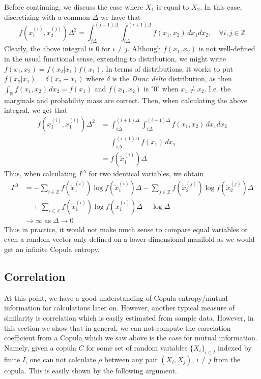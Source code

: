 \documentclass[../Thesis.tex]{subfiles}
\begin{document}
Before continuing, we discuss the case where $X_1$ is equal to $X_2$. In this case, discretizing with a common $\Delta$ we have that
$$f\left(x_1^{(i)}, x_2^{(j)}\right)\Delta^2 = \int_{j\Delta}^{(j+1)\Delta}\int_{i\Delta}^{(i+1)\Delta} f(x_1,x_2) \, dx_1 dx_2,\quad \forall i,j\in\mathbb{Z}$$
Clearly, the above integral is $0$ for $i\neq j$. Although $f(x_1,x_2)$ is not well-defined in the usual functional sense, extending to distribution, we might write $f(x_1,x_2) = f(x_2 | x_1) f(x_1)$. In terms of distributions, it works to put $f(x_2 | x_1) = \delta(x_2 - x_1)$ where $\delta$ is the \textit{Dirac delta} distribution, as then $\int_{\mathbb{R}} f(x_1,x_2) \, dx_2 = f(x_1)$ and $f(x_1, x_2)$ is "$0$" when $x_1 \neq x_2$. I.e. the marginals and probability mass are correct. Then, when calculating the above integral, we get that
\begin{align*}
    f\left(x_1^{(i)}, x_1^{(i)}\right)\Delta^2 & = \int_{i\Delta}^{(i+1)\Delta}\int_{i\Delta}^{(i+1)\Delta} f(x_1,x_2) \, dx_1 dx_2 \\
                                               & = \int_{i\Delta}^{(i+1)\Delta} f\left(x_1\right)\, dx_1                            \\
                                               & = f\left(\tilde{x}_1^{(i)}\right)\Delta
\end{align*}
Thus, when calculating $I^{\Delta}$ for two identical variables, we obtain
\begin{align*}
    I^{\Delta} & = -\sum_{i\in\mathbb{Z}} f\left(\tilde{x}_1^{(i)}\right) \log{f\left(\tilde{x}_1^{(i)}\right)}\Delta - \sum_{j\in\mathbb{Z}} f\left(\tilde{x}_2^{(j)}\right)  \log{f\left(\tilde{x}_2^{(j)}\right)}\Delta \\
               & \quad + \sum_{i\in\mathbb{Z}} f\left(\tilde{x}_1^{(i)}\right) \log{f\left(\tilde{x}_1^{(i)}\right)}\Delta - \log \Delta                                                                                   \\
               & \to \infty \;\text{as}\; \Delta \to 0
\end{align*}
Thus in practice, it would not make much sense to compare equal variables or even a random vector only defined on a lower dimensional manifold as we would get an infinite Copula entropy.





\subsection{Correlation}
At this point, we have a good understanding of Copula entropy/mutual information for calculations later on. However, another typical measure of similarity is correlation which is easily estimated from sample data. However, in this section we show that in general, we can not compute the correlation coefficient from a Copula which we saw above is the case for mutual information. Namely, given a copula $C$ for some set of random variables $\{X_i\}_{i\in I}$ indexed by finite $I$, one can not calculate $\rho$ between any pair $(X_i ,X_j)$, $i\neq j$ from the copula. This is easily shown by the following argument.
\end{document}
